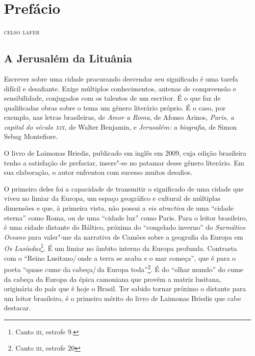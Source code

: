 \chapter[Prefácio, \textit{por Celso Lafer}]{Prefácio }

\begin{flushright}
\textsc{celso lafer}
\end{flushright}

\section*{A Jerusalém da Lituânia}

\noindent{}Escrever sobre uma cidade procurando desvendar seu significado é uma
tarefa difícil e desafiante. Exige múltiplos conhecimentos, antenas de
compreensão e sensibilidade, conjugados com os talentos de um escritor.
É o que faz de qualificadas obras sobre o tema um gênero literário
próprio. É o caso, por exemplo, nas letras brasileiras, de \textit{Amor a
Roma}, de Afonso Arinos, \textit{Paris, a capital do século \textsc{xix}},
de Walter Benjamin, e \textit{Jerusalém: a biografia}, de Simon Sebag
Montefiore.

O livro de Laimonas Briedis, publicado em inglês em 2009, cuja edição
brasileira tenho a satisfação de prefaciar, insere"-se no patamar desse
gênero literário. Em sua elaboração, o autor enfrentou com sucesso
muitos desafios.

O primeiro deles foi a capacidade de transmitir o significado de uma
cidade que viveu no limiar da Europa, um espaço geográfico e cultural de
múltiplas dimensões e que, à primeira vista, não possui a \textit{vis
atractiva} de uma ``cidade eterna'' como Roma, ou de uma ``cidade luz''
como Paris. Para o leitor brasileiro, é uma cidade distante do Báltico,
próxima do ``congelado inverno'' do \textit{Sarmático Oceano} para valer"-me da
narrativa de Camões sobre a geografia da Europa em \textit{Os Lusíadas}\footnote{Canto \textsc{iii}, estrofe 9.}. É um limiar no âmbito interno da Europa profunda. Contrasta
com o ``Reino Lusitano/\,onde a terra se acaba e o mar começa'', que é
para o poeta ``quase cume da cabeça/\,da Europa toda''\footnote{Canto \textsc{iii}, estrofe 20}. 
É do ``olhar mundo'' do cume da cabeça da Europa da
épica camoniana que provém a matriz lusitana, originária do país que é
hoje o Brasil. Ter sabido tornar próximo o distante para um leitor
brasileiro, é o primeiro mérito do livro de Laimonas Briedis que cabe
destacar.

